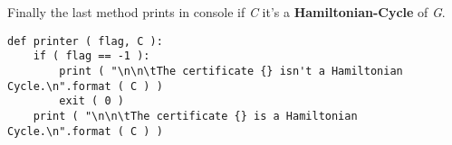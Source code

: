 Finally the last method prints in console if {\itshape C} it's a {\bfseries Hamiltonian-Cycle} of {\itshape G}. \hfill \break

\begin{lstlisting}
def printer ( flag, C ):
    if ( flag == -1 ):
        print ( "\n\n\tThe certificate {} isn't a Hamiltonian Cycle.\n".format ( C ) )
        exit ( 0 )
    print ( "\n\n\tThe certificate {} is a Hamiltonian Cycle.\n".format ( C ) )
\end{lstlisting}

\pagebreak